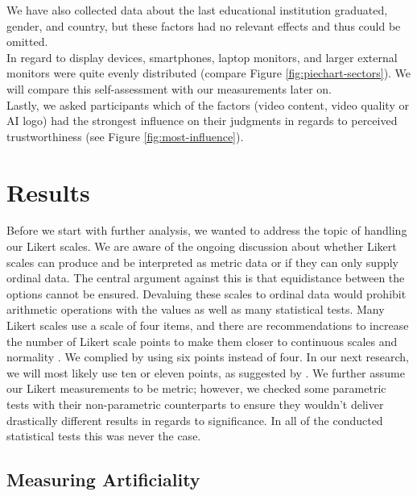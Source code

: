 \documentclass[
  a4paper,  %
  twoside,  %
  bibliography=totoc,
  headsepline,
  cleardoublepage=empty,
  parskip=half,
  draft=false
]{scrbook}
\begin{document}
We have also collected data about the last educational institution graduated, gender, and country, but these factors had no relevant effects and thus could be omitted. \\
In regard to display devices, smartphones, laptop monitors, and larger external monitors were quite evenly distributed (compare Figure \ref{fig:piechart-sectors}). We will compare this self-assessment with our measurements later on. \\
Lastly, we asked participants which of the factors (video content, video quality or AI logo) had the strongest influence on their judgments in regards to perceived trustworthiness (see Figure \ref{fig:most-influence}).

\section{Results}
\label{sec:results}

Before we start with further analysis, we wanted to address the topic of handling our Likert scales. We are aware of the ongoing discussion about whether Likert scales can produce and be interpreted as metric data or if they can only supply ordinal data. The central argument against this is that equidistance between the options cannot be ensured. Devaluing these scales to ordinal data would prohibit arithmetic operations with the values as well as many statistical tests. Many Likert scales use a scale of four items, and there are recommendations to increase the number of Likert scale points to make them closer to continuous scales and normality \cite{wuCanLikertScales2017a}. We complied by using six points instead of four. In our next research, we will most likely use ten or eleven points, as suggested by . We further assume our Likert measurements to be metric; however, we checked some parametric tests with their non-parametric counterparts to ensure they wouldn't deliver drastically different results in regards to significance. In all of the conducted statistical tests this was never the case.

\subsection{Measuring Artificiality}
\end{document}
